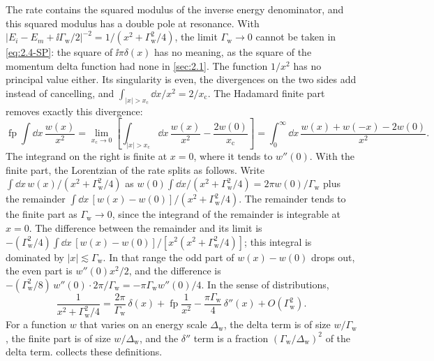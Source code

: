 The rate contains the squared modulus of the inverse energy denominator, and this squared modulus has a double pole at resonance. With $|E_i - E_m + \ii\varGamma_{\mathrm{w}}/2|^{-2} = 1/(x^2 + \varGamma_{\mathrm{w}}^2/4)$, the limit $\varGamma_{\mathrm{w}} \to 0$ cannot be taken in \cref{eq:2.4-SP}: the square of $\ii\pi\delta(x)$ has no meaning, as the square of the momentum delta function had none in \cref{sec:2.1}. The function $1/x^2$ has no principal value either. Its singularity is even, the divergences on the two sides add instead of cancelling, and $\int_{|x| > x_{\mathrm{c}}}\dd x/x^2 = 2/x_{\mathrm{c}}$. The Hadamard finite part removes exactly this divergence:
\begin{equation}
  \operatorname{fp}\!\int\dd x\,\frac{w(x)}{x^2}
  = \lim_{x_{\mathrm{c}}\to0}\left[\int_{|x|>x_{\mathrm{c}}}\dd x\,\frac{w(x)}{x^2} - \frac{2w(0)}{x_{\mathrm{c}}}\right]
  = \int_0^\infty\dd x\,\frac{w(x) + w(-x) - 2w(0)}{x^2} .
  \label{eq:2.4-fp}
\end{equation}
The integrand on the right is finite at $x = 0$, where it tends to $w''(0)$. With the finite part, the Lorentzian of the rate splits as follows. Write $\int\dd x\,w(x)/(x^2 + \varGamma_{\mathrm{w}}^2/4)$ as $w(0)\int\dd x/(x^2 + \varGamma_{\mathrm{w}}^2/4) = 2\pi w(0)/\varGamma_{\mathrm{w}}$ plus the remainder $\int\dd x\,[w(x) - w(0)]/(x^2 + \varGamma_{\mathrm{w}}^2/4)$. The remainder tends to the finite part as $\varGamma_{\mathrm{w}} \to 0$, since the integrand of the remainder is integrable at $x = 0$. The difference between the remainder and its limit is $-(\varGamma_{\mathrm{w}}^2/4)\int\dd x\,[w(x) - w(0)]/[x^2(x^2 + \varGamma_{\mathrm{w}}^2/4)]$; this integral is dominated by $|x| \lesssim \varGamma_{\mathrm{w}}$. In that range the odd part of $w(x) - w(0)$ drops out, the even part is $w''(0)x^2/2$, and the difference is $-(\varGamma_{\mathrm{w}}^2/8)\,w''(0)\cdot 2\pi/\varGamma_{\mathrm{w}} = -\pi\varGamma_{\mathrm{w}}w''(0)/4$. In the sense of distributions,
\begin{equation}
  \frac{1}{x^2 + \varGamma_{\mathrm{w}}^2/4} = \frac{2\pi}{\varGamma_{\mathrm{w}}}\,\delta(x) + \operatorname{fp}\frac{1}{x^2} - \frac{\pi\varGamma_{\mathrm{w}}}{4}\,\delta''(x) + O(\varGamma_{\mathrm{w}}^2) .
  \label{eq:2.4-split}
\end{equation}
For a function $w$ that varies on an energy scale $\Delta_{\mathrm{w}}$, the delta term is of size $w/\varGamma_{\mathrm{w}}$, the finite part is of size $w/\Delta_{\mathrm{w}}$, and the $\delta''$ term is a fraction $(\varGamma_{\mathrm{w}}/\Delta_{\mathrm{w}})^2$ of the delta term.  collects these definitions.

